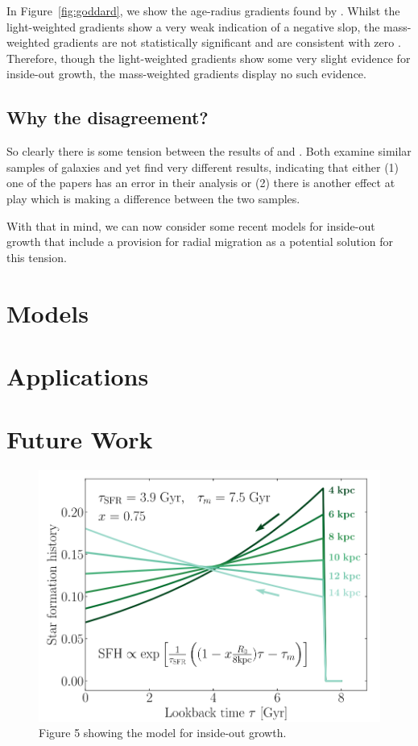 \documentclass[preprint2]{aastex631}
\begin{document}
In Figure~\ref{fig:goddard}, we show the age-radius gradients found by \citet{Goddard+2017}. Whilst the light-weighted gradients show a very weak indication of a negative slop, the mass-weighted gradients are not statistically significant and are consistent with zero \citep[in agreement with][]{Sanchez-Blazquez+2014}. Therefore, though the light-weighted gradients show some very slight evidence for inside-out growth, the mass-weighted gradients display no such evidence.

\subsection{Why the disagreement?}
So clearly there is some tension between the results of \citet{vanDokkum+2013} and \citet{Goddard+2017}. Both examine similar samples of galaxies and yet find very different results, indicating that either (1) one of the papers has an error in their analysis or (2) there is another effect at play which is making a difference between the two samples.

With that in mind, we can now consider some recent models for inside-out growth that include a provision for radial migration as a potential solution for this tension.

\section{Models}
\citep{Frankel+2019}

\section{Applications}
\citep{Banerjee+2020}

\section{Future Work}
\citep{Hogg+2019}

\begin{figure}[htb]
    \centering
    \includegraphics[width=\columnwidth]{frankel2019_fig5.png}
    \caption{\citet{Frankel+2019} Figure 5 showing the model for inside-out growth.}
\end{figure}
\end{document}

